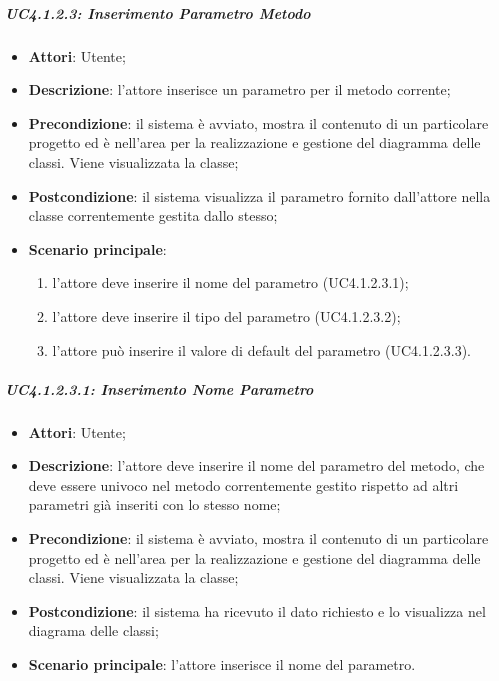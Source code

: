 \subparagraph{UC4.1.2.3: Inserimento Parametro Metodo}
\label{UC4.1.2.3}
\begin{itemize}
	\item \textbf{Attori}: Utente;
	\item \textbf{Descrizione}: l'attore inserisce un parametro per il metodo corrente;
	\item \textbf{Precondizione}:  il sistema è avviato, mostra il contenuto di un particolare progetto ed è nell'area per la realizzazione e gestione del diagramma delle classi. Viene visualizzata la classe;
	\item \textbf{Postcondizione}: il sistema visualizza il parametro fornito dall'attore nella classe correntemente gestita dallo stesso;
	\item \textbf{Scenario principale}:
	\begin{enumerate}
		\item l'attore deve inserire il nome del parametro (UC4.1.2.3.1);
		\item l'attore deve inserire il tipo del parametro (UC4.1.2.3.2);
		\item l'attore può inserire il valore di default del parametro (UC4.1.2.3.3).
	\end{enumerate}
\end{itemize}

\subparagraph{UC4.1.2.3.1: Inserimento Nome Parametro}
\label{UC4.1.2.3.1}
\begin{itemize}
	\item \textbf{Attori}: Utente;
	\item \textbf{Descrizione}: l'attore deve inserire il nome del parametro del metodo, che deve essere univoco nel metodo correntemente gestito rispetto ad altri parametri già inseriti con lo stesso nome;
	\item \textbf{Precondizione}: il sistema è avviato, mostra il contenuto di un particolare progetto ed è nell'area per la realizzazione e gestione del diagramma delle classi. Viene visualizzata la classe;
	\item \textbf{Postcondizione}: il sistema ha ricevuto il dato richiesto e lo visualizza nel diagrama delle classi;
	\item \textbf{Scenario principale}: l'attore inserisce il nome del parametro.
\end{itemize}

